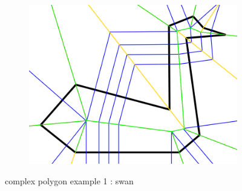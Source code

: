 \documentclass[11pt]{article}
\begin{document}
\begin{figure}[H]
\begin{subfigure}[b]{0.18\textwidth}
    \includegraphics[width=\textwidth]{FIGS/Part4/c14}
     \caption{}
     \label{fig:c14}
  \end{subfigure}
    \caption{complex polygon example 1 : swan}
    \label{fig:complex_example1}
\end{figure}
\end{document}
